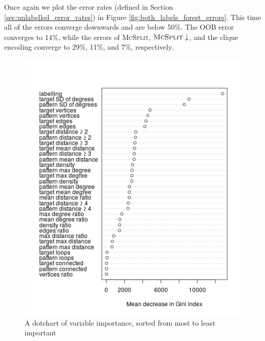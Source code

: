 \documentclass{l4proj}
\theoremstyle{definition}
\theoremstyle{remark}
\begin{document}
Once again we plot the error rates (defined in Section
\ref{sec:unlabelled_error_rates}) in Figure \ref{fig:both_labels_forest_errors}.
This time all of the errors converge downwards and are below 50\%. The OOB error
converges to 14\%, while the errors of \textsc{McSplit},
$\textsc{McSplit}\downarrow$, and the clique encoding converge to 29\%, 11\%,
and 7\%, respectively.

\begin{figure}
  \centering
  \includegraphics{images/both_labels_variable_importance.png}
  \caption{A dotchart of variable importance, sorted from most to least important}
  \label{fig:both_labels_variable_importance}
\end{figure}
\end{document}
